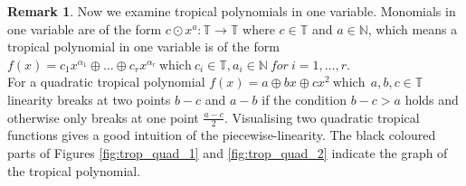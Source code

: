 \documentclass{article}
\theoremstyle{definition}
\newtheorem{remark}[theorem]{Remark}
\begin{document}
\begin{remark}
Now we examine tropical polynomials in one variable. Monomials in one variable are of the form $ c \odot x^{a}: \mathbb{T} \to \mathbb{T}$ where $c \in \mathbb{T}$ and $ a \in \mathbb{N} $, which means a tropical polynomial in one variable is of the form $f(x)=c_1x^{\alpha_1} \oplus \dots \oplus c_rx^{\alpha_r} \ \text{which} \ c_i \in \mathbb{T}, a_i \in \mathbb{N} \ for \ i=1, \dots , r$. \\
For a quadratic tropical polynomial $f(x) = a \oplus bx \oplus cx^{2} \ \text{which} \ \ a,b,c \in \mathbb{T}$ linearity breaks at two points $b-c$ and $a-b$ if the condition $b-c > a$ holds and otherwise only breaks at one point $\frac{a-c}{2}$. Visualising two quadratic tropical functions gives a good intuition of the piecewise-linearity. The black coloured parts of Figures \ref{fig:trop_quad_1} and \ref{fig:trop_quad_2} indicate the graph of the tropical polynomial.

\begin{figure}[h]


\end{figure}
\end{remark}
\end{document}

